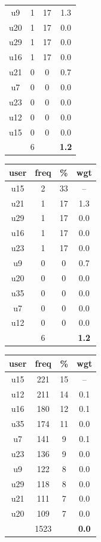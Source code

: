 \begin{table}
\begin{tabular}{ |c|c|c|c| }
	u9 & 1 & 17 & 1.3 \\
	u20 & 1 & 17 & 0.0 \\
	u29 & 1 & 17 & 0.0 \\
	u16 & 1 & 17 & 0.0 \\
	u21 & 0 & 0 & 0.7 \\
	u7 & 0 & 0 & 0.0 \\
	u23 & 0 & 0 & 0.0 \\
	u12 & 0 & 0 & 0.0 \\
	u15 & 0 & 0 & 0.0 \\
	 & 6 & & \textbf{1.2} \\
	\hline
\end{tabular}
\begin{tabular}{ |c|c|c|c| }
	\hline
	\textbf{user} & \textbf{freq} & \textbf{\%} & \textbf{wgt} \\
	\hline
	u15 & 2 & 33 & -- \\
	u21 & 1 & 17 & 1.3 \\
	u29 & 1 & 17 & 0.0 \\
	u16 & 1 & 17 & 0.0 \\
	u23 & 1 & 17 & 0.0 \\
	u9 & 0 & 0 & 0.7 \\
	u20 & 0 & 0 & 0.0 \\
	u35 & 0 & 0 & 0.0 \\
	u7 & 0 & 0 & 0.0 \\
	u12 & 0 & 0 & 0.0 \\
	 & 6 & & \textbf{1.2} \\
	\hline
\end{tabular}
\begin{tabular}{ |c|c|c|c| }
	\hline
	\textbf{user} & \textbf{freq} & \textbf{\%} & \textbf{wgt} \\
	\hline
	u15 & 221 & 15 & -- \\
	u12 & 211 & 14 & 0.1 \\
	u16 & 180 & 12 & 0.1 \\
	u35 & 174 & 11 & 0.0 \\
	u7 & 141 & 9 & 0.1 \\
	u23 & 136 & 9 & 0.0 \\
	u9 & 122 & 8 & 0.0 \\
	u29 & 118 & 8 & 0.0 \\
	u21 & 111 & 7 & 0.0 \\
	u20 & 109 & 7 & 0.0 \\
	 & 1523 & & \textbf{0.0} \\

\end{tabular}
\end{table}

